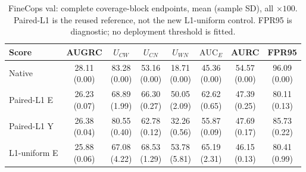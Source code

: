\begin{table}[t]
\centering\footnotesize
\setlength{\tabcolsep}{3pt}
\renewcommand{\arraystretch}{1.15}
\caption{FineCops val: complete coverage-block endpoints, mean (sample SD), all $\times100$. Paired-L1 is the reused reference, not the new L1-uniform control. FPR95 is diagnostic; no deployment threshold is fitted.}\label{tab:coverage_endpoints_finecops_val}
\begin{tabular}{@{}lccccccc@{}}\toprule
Score & AUGRC & $U_{CW}$ & $U_{CN}$ & $U_{WN}$ & $\mathrm{AUC}_E$ & AURC & FPR95\\\midrule
Native & \shortstack{28.11\\{\scriptsize (0.00)}} & \shortstack{83.28\\{\scriptsize (0.00)}} & \shortstack{53.16\\{\scriptsize (0.00)}} & \shortstack{18.71\\{\scriptsize (0.00)}} & \shortstack{45.36\\{\scriptsize (0.00)}} & \shortstack{54.57\\{\scriptsize (0.00)}} & \shortstack{96.09\\{\scriptsize (0.00)}}\\
Paired-L1 E & \shortstack{26.23\\{\scriptsize (0.07)}} & \shortstack{68.89\\{\scriptsize (1.99)}} & \shortstack{66.30\\{\scriptsize (0.27)}} & \shortstack{50.05\\{\scriptsize (2.09)}} & \shortstack{62.62\\{\scriptsize (0.65)}} & \shortstack{47.39\\{\scriptsize (0.25)}} & \shortstack{80.11\\{\scriptsize (0.13)}}\\
Paired-L1 Y & \shortstack{26.38\\{\scriptsize (0.04)}} & \shortstack{80.55\\{\scriptsize (0.40)}} & \shortstack{62.78\\{\scriptsize (0.12)}} & \shortstack{32.26\\{\scriptsize (0.56)}} & \shortstack{55.87\\{\scriptsize (0.09)}} & \shortstack{47.69\\{\scriptsize (0.17)}} & \shortstack{85.73\\{\scriptsize (0.22)}}\\
L1-uniform E & \shortstack{25.88\\{\scriptsize (0.06)}} & \shortstack{67.08\\{\scriptsize (4.22)}} & \shortstack{68.53\\{\scriptsize (1.29)}} & \shortstack{53.78\\{\scriptsize (5.81)}} & \shortstack{65.19\\{\scriptsize (2.31)}} & \shortstack{46.15\\{\scriptsize (0.13)}} & \shortstack{80.41\\{\scriptsize (0.99)}}\\

\end{tabular}
\end{table}
